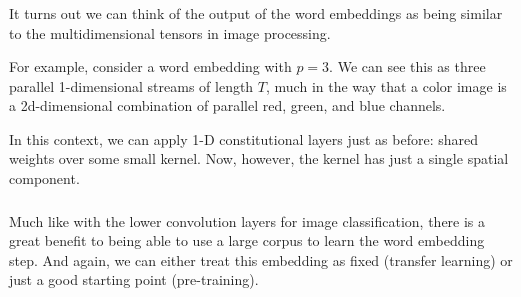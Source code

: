 \documentclass[xetex,mathserif,serif,aspectratio=169]{beamer}
\begin{document}
\begin{frame}[fragile] \frametitle{} \oldB \small


\end{frame}


\begin{frame}[fragile] \frametitle{} \oldB \small


It turns out we can think of the output of the word embeddings
as being similar to the multidimensional tensors in image
processing.

For example, consider a word embedding with $p=3$. We can see
this as three parallel 1-dimensional streams of length $T$,
much in the way that a color image is a 2d-dimensional combination
of parallel red, green, and blue channels.

\pause In this context, we can apply 1-D constitutional layers
just as before: shared weights over some small kernel. Now, however,
the kernel has just a single spatial component.

\end{frame}

\begin{frame}[fragile] \frametitle{} \oldB \small


\end{frame}

\begin{frame}[fragile] \frametitle{} \oldB \small


\end{frame}

\begin{frame}[fragile] \frametitle{} \oldB \small


Much like with the lower convolution layers for image classification,
there is a great benefit to being able to use a large corpus to
learn the word embedding step. And again, we can either treat this
embedding as fixed (transfer learning) or just a good starting point
(pre-training).

\end{frame}
\end{document}
